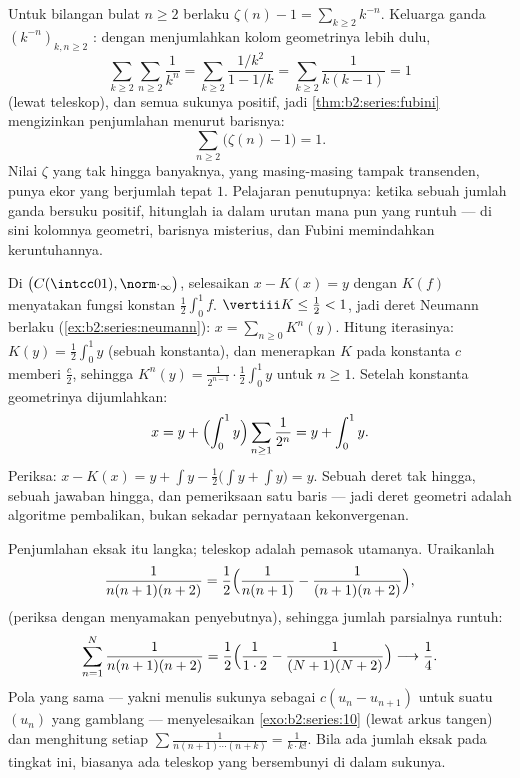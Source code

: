 \begin{example}[Sebuah penilaian Fubini: $\sum_n (\zeta(n) - 1) = 1$]\label{ex:b2:series:zetasum}
Untuk bilangan bulat $n \geq 2$ berlaku $\zeta(n) - 1 = \sum_{k \geq 2}
k^{-n}$. Keluarga ganda $(k^{-n})_{k, n \geq 2}$ : dengan
menjumlahkan kolom geometrinya lebih dulu,
\[
\sum_{k\geq2}\sum_{n\geq2} \frac{1}{k^n}
= \sum_{k\geq2} \frac{1/k^2}{1 - 1/k}
= \sum_{k\geq2} \frac{1}{k(k-1)} = 1
\]
(lewat teleskop), dan semua sukunya positif, jadi
\cref{thm:b2:series:fubini} mengizinkan penjumlahan menurut barisnya:
\[
\sum_{n\geq2}\bigl(\zeta(n) - 1\bigr) = 1 .
\]
Nilai $\zeta$ yang tak hingga banyaknya, yang masing-masing tampak
transenden, punya ekor yang berjumlah tepat $1$. Pelajaran penutupnya:
ketika sebuah jumlah ganda bersuku positif, hitunglah ia dalam urutan
mana pun yang runtuh --- di sini kolomnya geometri, barisnya misterius,
dan Fubini memindahkan keruntuhannya.
\end{example}

\begin{example}\label{ex:b2:series:neumannsolve}
Di  $\bigl(C(\intcc01),
\norm\cdot_\infty\bigr)$, selesaikan $x - K(x) = y$ dengan $K(f)$
menyatakan fungsi konstan $\frac12\int_0^1 f$. 
$\vertiii K \leq \frac12 < 1$, jadi deret Neumann berlaku
(\cref{ex:b2:series:neumann}): $x = \sum_{n\geq0} K^n(y)$.
Hitung iterasinya: $K(y) = \frac12\int_0^1 y$ (sebuah konstanta),
dan menerapkan $K$ pada konstanta $c$ memberi $\frac c2$, sehingga
$K^n(y) = \frac{1}{2^{n-1}}\cdot\frac12\int_0^1 y$ untuk $n \geq
1$. Setelah konstanta geometrinya dijumlahkan:
\[
x = y + \Bigl(\int_0^1 y\Bigr)
\sum_{n\geq1}\frac{1}{2^n} = y + \int_0^1 y .
\]
Periksa: $x - K(x) = y + \int y - \frac12\bigl(\int y + \int
y\bigr) = y$. Sebuah deret tak hingga, sebuah jawaban hingga, dan
pemeriksaan satu baris --- jadi deret geometri adalah algoritme
pembalikan, bukan sekadar pernyataan kekonvergenan.
\end{example}

\begin{example}\label{ex:b2:series:telescope}
Penjumlahan eksak itu langka; teleskop adalah pemasok utamanya.
Uraikanlah
\[
\frac{1}{n(n+1)(n+2)}
= \frac{1}{2}\Bigl(\frac{1}{n(n+1)} -
\frac{1}{(n+1)(n+2)}\Bigr),
\]
(periksa dengan menyamakan penyebutnya), sehingga jumlah
parsialnya runtuh:
\[
\sum_{n=1}^{N}\frac{1}{n(n+1)(n+2)}
= \frac12\Bigl(\frac{1}{1\cdot2} -
\frac{1}{(N+1)(N+2)}\Bigr)
\longrightarrow \frac14 .
\]
Pola yang sama --- yakni menulis sukunya sebagai $c(u_n - u_{n+1})$
untuk suatu $(u_n)$ yang gamblang --- menyelesaikan \cref{exo:b2:series:10}
(lewat arkus tangen) dan menghitung setiap $\sum\frac{1}{n(n+1)\cdots(n +
k)} = \frac{1}{k\cdot k!}$. Bila ada jumlah eksak pada
tingkat ini, biasanya ada teleskop yang bersembunyi di dalam sukunya.
\end{example}

